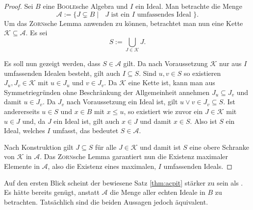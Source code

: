 \begin{proof}
  Sei $B$ eine \textsc{Boole}sche Algebra und $I$ ein Ideal. 
  Man betrachte die Menge
  \begin{displaymath}
    \mathcal{A} := \{J \subsetneq B \mid \text{ $J$ ist ein $I$ umfassendes Ideal } \}.
  \end{displaymath}
  Um das \textsc{Zorn}sche Lemma anwenden zu können, betrachtet man nun eine Kette $\mathcal{K} \subseteq \mathcal{A}$.
  Es sei 
  \begin{displaymath}
    S := \bigcup_{J \in \mathcal{K}} J.
  \end{displaymath}

  Es soll nun gezeigt werden, dass $S \in \mathcal{A}$ gilt.
  Da nach Voraussetzung $\mathcal{K}$ nur aus $I$ umfassenden Idealen besteht, gilt auch $I \subseteq S$.
  Sind $u,v \in S$ so existieren $J_u, J_v \in \mathcal{K}$ mit $u \in J_u$ und $v \in J_v$.
  Da $\mathcal{K}$ eine Kette ist, kann man aus Symmetriegründen ohne Beschränkung der Allgemeinheit annehmen $J_u \subseteq J_v$ und damit $u \in J_v$.
  Da $J_v$ nach Voraussetzung ein Ideal ist, gilt $u \lor v \in J_v \subseteq S$.
  Ist andererseits $u \in S$ und $x \in B$ mit $x \leq u$, so existiert wie zuvor ein $J \in \mathcal{K}$ mit $u \in J$ und, da $J$ ein Ideal ist, gilt auch $x \in J$ und damit $x \in S$.
  Also ist $S$ ein Ideal, welches $I$ umfasst, das bedeutet $S \in \mathcal{A}$.

  Nach Konstruktion gilt $J \subseteq S$ für alle $J \in \mathcal{K}$ und damit ist $S$ eine obere Schranke von $\mathcal{K}$ in $\mathcal{A}$.
  Das \textsc{Zorn}sche Lemma garantiert nun die Existenz maximaler Elemente in $\mathcal{A}$, also die Existenz eines maximalen, $I$ umfassenden Ideals.
\end{proof}

\begin{bem}
  Auf den ersten Blick scheint der bewiesene Satz \ref{thm:acpit} stärker zu sein als \PIT.
  Es hätte bereits genügt, anstatt $\mathcal{A}$ die Menge aller echten Ideale in $B$ zu betrachten.
  Tatsächlich sind die beiden Aussagen jedoch äquivalent.
\end{bem}

